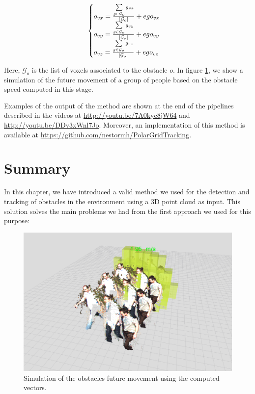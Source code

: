 \begin{equation}\label{eq:cp05_obstacle_vectors_computation}
\begin{cases}
o_{vx} = {{\sum\limits_{g \in \mathcal{G}_o} g_{vx}} \over {|\mathcal{G}_o|}} + ego_{vx}\\
o_{vy} = {{\sum\limits_{g \in \mathcal{G}_o} g_{vy}} \over {|\mathcal{G}_o|}} + ego_{vy}\\
o_{vz} = {{\sum\limits_{g \in \mathcal{G}_o} g_{vz}} \over {|\mathcal{G}_o|}} + ego_{vz}
\end{cases}
\end{equation}

Here, $\mathcal{G}_o$ is the list of voxels associated to the obstacle $o$. In figure \ref{fig:cp05_obstacle_vectors_computation}, we  show a simulation of the future movement of a group of people based on the obstacle speed computed in this stage.

Examples of the output of the method are shown at the end of the pipelines described in the videos at \url{http://youtu.be/7A0kyc8jW64} and \url{http://youtu.be/DDv3xWnl7Jo}. Moreover, an implementation of this method is available at \url{https://github.com/nestormh/PolarGridTracking}.

\section{Summary}\label{ch:chapter05_03}
 
In this chapter, we have introduced a valid method we used for the detection and tracking of obstacles in the environment using a 3D point cloud as input. This solution solves the main problems we had from the first approach we used for this purpose:

\begin{figure}[h!]
  \centering
  \includegraphics{fakePointCloud}
  \caption{Simulation of the obstacles future movement using the computed vectors.}\label{fig:cp05_obstacle_vectors_computation}
\end{figure}

